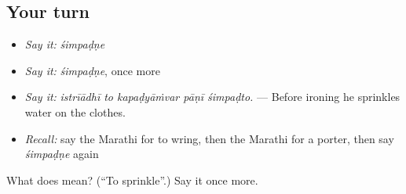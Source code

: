 \subsection*{Your turn}
\begin{itemize}
\raggedright
  \item \emph{Say it:} \emph{śimpaḍṇe}
  \item \emph{Say it:} \emph{śimpaḍṇe}, once more
  \item \emph{Say it:} \emph{istrīādhī to kapaḍyāṁvar pāṇī śimpaḍto.} — Before ironing he sprinkles water on the clothes.
  \item \emph{Recall:} say the Marathi for to wring, then the Marathi for a porter, then say \emph{śimpaḍṇe} again
\end{itemize}

\begin{tcolorbox}[breakable,colback=teal!4,colframe=teal!35!black,title={Before you move on}]
What does  mean? (\textquotedblleft{}To sprinkle\textquotedblright{}.) Say it once more.
\end{tcolorbox}

